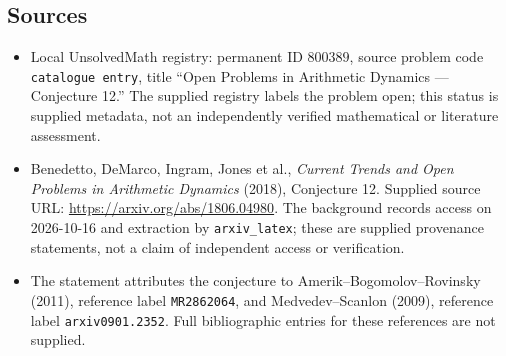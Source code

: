 \documentclass[11pt]{article}
\begin{document}
\subsection{Sources}
\begin{itemize}
\item Local UnsolvedMath registry: permanent ID \(800389\), source problem code \texttt{catalogue entry}, title ``Open Problems in Arithmetic Dynamics --- Conjecture 12.'' The supplied registry labels the problem open; this status is supplied metadata, not an independently verified mathematical or literature assessment.
\item Benedetto, DeMarco, Ingram, Jones et al., \emph{Current Trends and Open Problems in Arithmetic Dynamics} (2018), Conjecture 12. Supplied source URL: \url{https://arxiv.org/abs/1806.04980}. The background records access on 2026-10-16 and extraction by \texttt{arxiv\_latex}; these are supplied provenance statements, not a claim of independent access or verification.
\item The statement attributes the conjecture to Amerik--Bogomolov--Rovinsky (2011), reference label \texttt{MR2862064}, and Medvedev--Scanlon (2009), reference label \texttt{arxiv0901.2352}. Full bibliographic entries for these references are not supplied.
\end{itemize}
\end{document}
